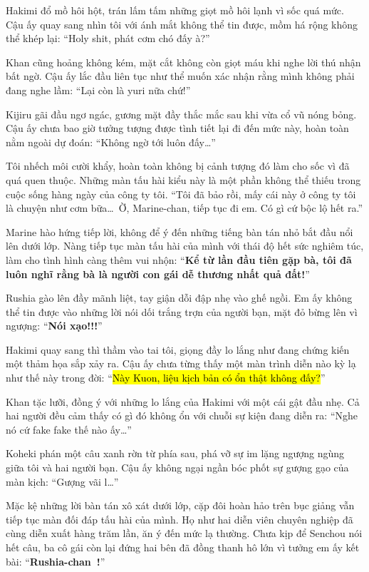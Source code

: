 \documentclass[../main.tex]{subfiles}
\begin{document}
Hakimi đổ mồ hôi hột, trán lấm tấm những giọt mồ hôi lạnh vì sốc quá mức. Cậu ấy quay sang nhìn tôi với ánh mắt không thể tin được, mồm há rộng không thể khép lại: ``Holy shit, phát cơm chó đấy à?''

Khan cũng hoảng không kém, mặt cắt không còn giọt máu khi nghe lời thú nhận bất ngờ. Cậu ấy lắc đầu liên tục như thể muốn xác nhận rằng mình không phải đang nghe lầm: ``Lại còn là yuri nữa chứ!''

Kijiru gãi đầu ngơ ngác, gương mặt đầy thắc mắc sau khi vừa cổ vũ nóng bỏng. Cậu ấy chưa bao giờ tưởng tượng được tình tiết lại đi đến mức này, hoàn toàn nằm ngoài dự đoán: ``Không ngờ tới luôn đấy\dots''

Tôi nhếch môi cười khẩy, hoàn toàn không bị cảnh tượng đó làm cho sốc vì đã quá quen thuộc. Những màn tấu hài kiểu này là một phần không thể thiếu trong cuộc sống hàng ngày của công ty tôi. ``Tôi đã bảo rồi, mấy cái này ở công ty tôi là chuyện như cơm bữa\dots\ Ờ, Marine-chan, tiếp tục đi em. Có gì cứ bộc lộ hết ra.''

Marine hào hứng tiếp lời, không để ý đến những tiếng bàn tán nhỏ bắt đầu nổi lên dưới lớp. Nàng tiếp tục màn tấu hài của mình với thái độ hết sức nghiêm túc, làm cho tình hình càng thêm vui nhộn: ``\textbf{Kể từ lần đầu tiên gặp bà, tôi đã luôn nghĩ rằng bà là người con gái dễ thương nhất quả đất!}''

Rushia gào lên đầy mãnh liệt, tay giận dỗi đập nhẹ vào ghế ngồi. Em ấy không thể tin được vào những lời nói dối trắng trợn của người bạn, mặt đỏ bừng lên vì ngượng: ``\textbf{Nói xạo!!!}''

Hakimi quay sang thì thầm vào tai tôi, giọng đầy lo lắng như đang chứng kiến một thảm họa sắp xảy ra. Cậu ấy chưa từng thấy một màn trình diễn nào kỳ lạ như thế này trong đời: ``\hl{Này Kuon, liệu kịch bản có ổn thật không đấy?}''

Khan tặc lưỡi, đồng ý với những lo lắng của Hakimi với một cái gật đầu nhẹ. Cả hai người đều cảm thấy có gì đó không ổn với chuỗi sự kiện đang diễn ra: ``Nghe nó cứ fake fake thế nào ấy\dots''

Koheki phán một câu xanh rờn từ phía sau, phá vỡ sự im lặng ngượng ngùng giữa tôi và hai người bạn. Cậu ấy không ngại ngần bóc phốt sự gượng gạo của màn kịch: ``Gượng vãi l\dots''

Mặc kệ những lời bàn tán xô xát dưới lớp, cặp đôi hoàn hảo trên bục giảng vẫn tiếp tục màn đối đáp tấu hài của mình. Họ như hai diễn viên chuyên nghiệp đã cùng diễn xuất hàng trăm lần, ăn ý đến mức lạ thường. Chưa kịp để Senchou nói hết câu, ba cô gái còn lại đứng hai bên đã đồng thanh hô lớn vì tưởng em ấy kết bài: ``\textbf{Rushia-chan~!}''
\end{document}
